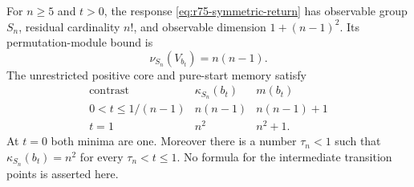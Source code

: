 \begin{theorem}
\label{thm:r75-symmetric-return}
For $n\ge5$ and $t>0$, the response \eqref{eq:r75-symmetric-return}
has observable group $S_n$, residual cardinality $n!$, and observable
dimension $1+(n-1)^2$. Its permutation-module bound is
\[
 \nu_{S_n}(V_{b_t})=n(n-1).
\]
The unrestricted positive core and pure-start memory satisfy
\[
 \begin{array}{c|c|c}
 \text{contrast}&\kappa_{S_n}(b_t)&m(b_t)\\\hline
 0<t\le1/(n-1)&n(n-1)&n(n-1)+1\\
 t=1&n^2&n^2+1.
 \end{array}
\]
At $t=0$ both minima are one. Moreover there is a number
$\tau_n<1$ such that $\kappa_{S_n}(b_t)=n^2$ for every
$\tau_n<t\le1$. No formula for the intermediate transition points
is asserted here.
\end{theorem}
